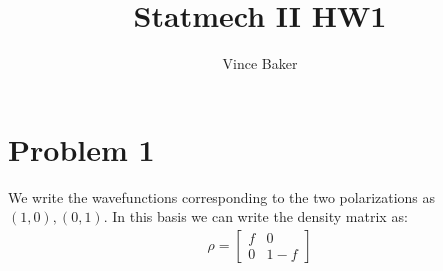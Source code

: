 \documentclass[a4paper,11pt]{article}
\title{Statmech II HW1}
\author{Vince Baker}
\numberwithin{equation}{section}
\begin{document}
\maketitle

\section{Problem 1}
We write the wavefunctions corresponding to the two polarizations as $(1,0),(0,1)$. 
In this basis we can write the density matrix as:
\begin{align}
 \rho=\begin{bmatrix}
       f & 0 \\
       0 & 1-f
      \end{bmatrix}
\end{align}
\\
\end{document}

